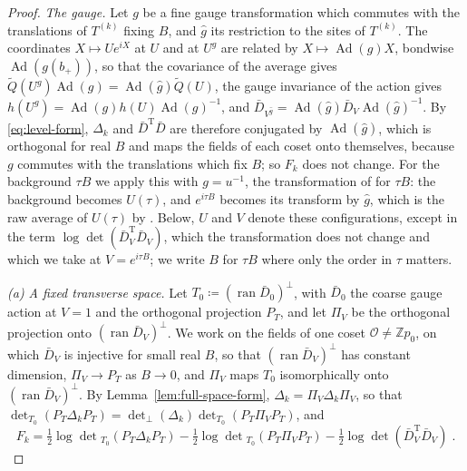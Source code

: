 \documentclass[11pt]{preprint}
\numberwithin{equation}{section}
\theoremstyle{definition}
\theoremstyle{remark}
\theoremstyle{plain}
\begin{document}
\begin{proof}
\emph{The gauge.} Let $g$ be a fine gauge transformation which commutes with the translations of $T^{(k)}$ fixing $B$, and $\hat g$ its restriction to the sites of $T^{(k)}$. The coordinates $X \mapsto Ue^{iX}$ at $U$ and at $U^g$ are related by $X \mapsto \operatorname{Ad}(g)X$, bondwise $\operatorname{Ad}(g(b_+))$, so that the covariance of the average \cite[(0.6)]{BalabanRG1} gives $\tilde Q(U^g)\operatorname{Ad}(g) = \operatorname{Ad}(\hat g)\tilde Q(U)$, the gauge invariance of the action gives $h(U^g) = \operatorname{Ad}(g)h(U)\operatorname{Ad}(g)^{-1}$, and $\bar D_{V^{\hat g}} = \operatorname{Ad}(\hat g)\bar D_V\operatorname{Ad}(\hat g)^{-1}$. By \eqref{eq:level-form}, $\Delta_k$ and $\bar D^{\mathrm T}\bar D$ are therefore conjugated by $\operatorname{Ad}(\hat g)$, which is orthogonal for real $B$ and maps the fields of each coset onto themselves, because $g$ commutes with the translations which fix $B$; so $F_k$ does not change. For the background $\tau B$ we apply this with $g = u^{-1}$, the transformation of \cite[p.~281]{BalabanVAR} for $\tau B$: the background becomes $U(\tau)$, and $e^{i\tau B}$ becomes its transform by $\hat g$, which is the raw average of $U(\tau)$ by \cite[(0.6)]{BalabanRG1}. Below, $U$ and $V$ denote these configurations, except in the term $\log\det(\bar D_V^{\mathrm T}\bar D_V)$, which the transformation does not change and which we take at $V = e^{i\tau B}$; we write $B$ for $\tau B$ where only the order in $\tau$ matters.

\emph{(a) A fixed transverse space.} Let $T_0 \coloneqq (\operatorname{ran}\bar D_0)^\perp$, with $\bar D_0$ the coarse gauge action at $V = 1$ and the orthogonal projection $P_T$, and let $\Pi_V$ be the orthogonal projection onto $(\operatorname{ran}\bar D_V)^\perp$. We work on the fields of one coset $\mathcal O \neq \mathbb Zp_0$, on which $\bar D_V$ is injective for small real $B$, so that $(\operatorname{ran}\bar D_V)^\perp$ has constant dimension, $\Pi_V \to P_T$ as $B \to 0$, and $\Pi_V$ maps $T_0$ isomorphically onto $(\operatorname{ran}\bar D_V)^\perp$. By Lemma~\ref{lem:full-space-form}, $\Delta_k = \Pi_V\Delta_k\Pi_V$, so that $\det_{T_0}(P_T\Delta_kP_T) = \det_\perp(\Delta_k)\det_{T_0}(P_T\Pi_VP_T)$, and
\begin{equation}\label{eq:top-split}
    F_k = \tfrac12\log\det{}_{T_0}(P_T\Delta_kP_T) - \tfrac12\log\det{}_{T_0}(P_T\Pi_VP_T) - \tfrac12\log\det(\bar D_V^{\mathrm T}\bar D_V)\;.
\end{equation}


\end{proof}
\end{document}
